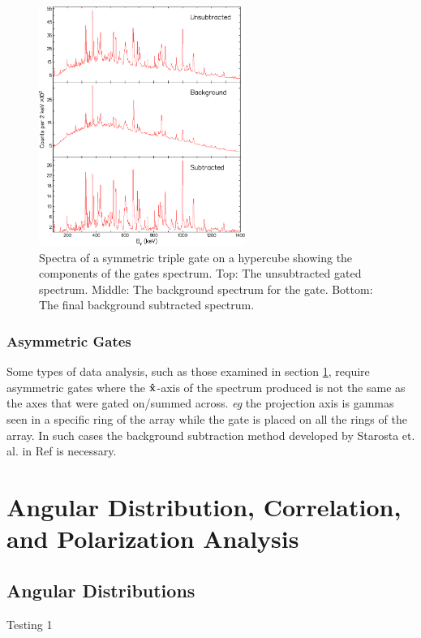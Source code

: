 \begin{figure}[h!]
	\centerline{\includegraphics[width=0.6\textwidth]{./img/c3/bg_sub_ex.eps}}
	\caption{Spectra of a symmetric triple gate on a hypercube showing the components of the gates spectrum. Top: The unsubtracted gated spectrum. Middle: The background spectrum for the gate. Bottom: The final background subtracted spectrum.}
	\label{fig:chp3-sym-bg-sub}
\end{figure}

\subsubsection{Asymmetric Gates}
\label{sssec:exp-pr-data-proc-bg-sub-asym}
Some types of data analysis, such as those examined in section \ref{sec:exp-pr-data-ang}, require asymmetric gates where the $\boldsymbol{\hat{\textbf{x}}}$-axis of the spectrum produced is not the same as the axes that were gated on/summed across. \emph{eg} the projection axis is gammas seen in a specific ring of the array while the gate is placed on all the rings of the array. In such cases the background subtraction method developed by Starosta et. al. in Ref \cite{asymBGSub} is necessary.

\section{Angular Distribution, Correlation, and Polarization Analysis}
\label{sec:exp-pr-data-ang}
\subsection{Angular Distributions}
\label{ssec:exp-pr-data-ang-dist}
Testing 1

